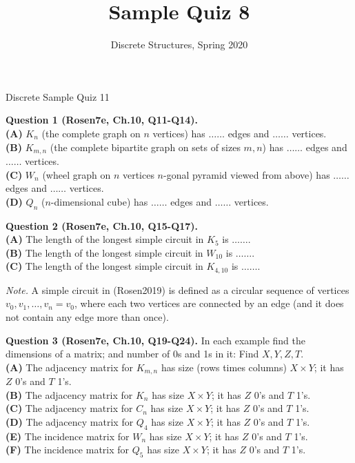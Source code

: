 \documentclass[jou]{apa6}
\title{Sample Quiz 8}
\author{Discrete Structures, Spring 2020}
\affiliation{RBS}
\begin{document}
\thispagestyle{empty}

\twocolumn
{\Large Discrete Sample Quiz 11}

{\bf Question 1 (Rosen7e, Ch.10, Q11-Q14).}\\
{\bf (A)} $K_n$ (the complete graph on $n$ vertices) has $\ldots\ldots$ edges and $\ldots\ldots$ vertices.\\
{\bf (B)} $K_{m,n}$ (the complete bipartite graph on sets of sizes $m,n$) has $\ldots\ldots$ edges and $\ldots\ldots$ vertices.\\
{\bf (C)} $W_n$ (wheel graph on $n$ vertices \textendash{} $n$-gonal pyramid
viewed from above) has $\ldots\ldots$ edges and $\ldots\ldots$ vertices.\\
{\bf (D)} $Q_n$ ($n$-dimensional cube) has $\ldots\ldots$ edges and $\ldots\ldots$ vertices.

\vspace{10pt}
{\bf Question 2 (Rosen7e, Ch.10, Q15-Q17).}\\
{\bf (A)} The length of the longest simple circuit in $K_5$ is $\ldots\ldots$.\\
{\bf (B)} The length of the longest simple circuit in $W_{10}$ is $\ldots\ldots$.\\
{\bf (C)} The length of the longest simple circuit in $K_{4,10}$ is $\ldots\ldots$.

{\em Note.} A simple circuit in (Rosen2019) is defined as a circular
sequence of vertices $v_0,v_1,\ldots,v_n=v_0$, 
where each two vertices are connected by an edge
(and it does not contain any edge more than once).

\vspace{10pt}
{\bf Question 3 (Rosen7e, Ch.10, Q19-Q24).} In each example find 
the dimensions of a matrix; and number of 0s and 1s in it: Find $X,Y,Z,T$.\\
{\bf (A)} The adjacency matrix for $K_{m,n}$ has size (rows times columns)
$X \times Y$; it has $Z$ 0's and $T$ 1's.\\
{\bf (B)} The adjacency matrix for $K_n$  
has size $X \times Y$; it has $Z$ 0's and $T$ 1's.\\
{\bf (C)} The adjacency matrix for $C_n$  
has size $X \times Y$; it has $Z$ 0's and $T$ 1's.\\
{\bf (D)} The adjacency matrix for $Q_4$  
has size $X \times Y$; it has $Z$ 0's and $T$ 1's.\\
{\bf (E)} The incidence matrix for $W_n$ 
has size $X \times Y$; it has $Z$ 0's and $T$ 1's.\\
{\bf (F)} The incidence matrix for $Q_5$ 
has size $X \times Y$; it has $Z$ 0's and $T$ 1's.
\end{document}
